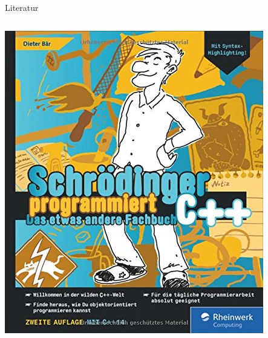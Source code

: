 \documentclass[presentation]{beamer}
\begin{document}
\begin{frame}[label={sec:orgf882c69}]{Literatur}
\begin{columns}
\begin{column}{0.5\columnwidth}
\begin{center}
\begin{center}
\includegraphics[width=.9\linewidth]{schroedinger.jpg}
\end{center}\end{center}
\end{column}
\end{columns}
\end{frame}
\end{document}
